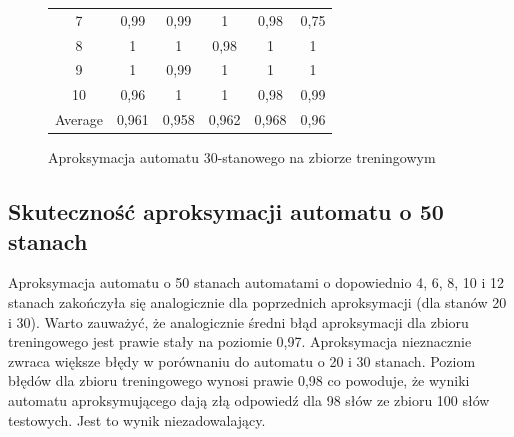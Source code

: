 \documentclass[runningheads,a4paper]{llncs}
\begin{document}
\begin{figure}[!htb]
\begin{tabular}{@{}cccccc@{}}
7       & 0,99     & 0,99     & 1        & 0,98      & 0,75    \\
8       & 1        & 1        & 0,98     & 1         & 1    \\
9       & 1        & 0,99     & 1        & 1         & 1 \\
10      & 0,96     & 1        & 1        & 0,98      & 0,99  \\ \bottomrule
Average & 0,961    & 0,958    & 0,962    & 0,968     & 0,96  \\ \bottomrule
\end{tabular}
\vspace{4mm}
\endminipage\hfill
\caption{Aproksymacja automatu 30-stanowego na zbiorze treningowym}
\end{figure}

\FloatBarrier
\subsection{Skuteczność aproksymacji automatu o 50 stanach}

Aproksymacja automatu o 50 stanach automatami o dopowiednio 4, 6, 8, 10 i 12 stanach zakończyła się analogicznie dla poprzednich aproksymacji (dla stanów 20 i 30). Warto zauważyć, że analogicznie średni błąd aproksymacji dla zbioru treningowego jest prawie stały na poziomie 0,97. Aproksymacja nieznacznie zwraca większe błędy w porównaniu do automatu o 20 i 30 stanach. Poziom błędów dla zbioru treningowego wynosi prawie 0,98 co powoduje, że wyniki automatu aproksymującego dają złą odpowiedź dla 98 słów ze zbioru 100 słów testowych. Jest to wynik niezadowalający.\\
\end{document}
